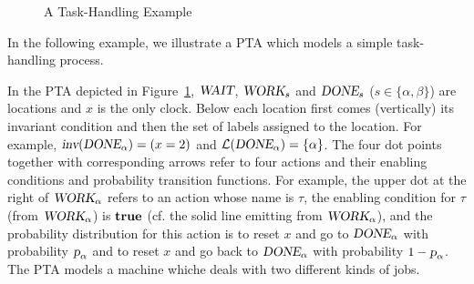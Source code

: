 
\begin{figure}
    \centering
    \resizebox{.5\textwidth}{!}{
        
        }
    \caption{A Task-Handling Example}
    \label{fig:pta}
\end{figure}

In the following example, we illustrate a PTA which models a simple task-handling process.

\begin{example}\label{ex:pta}
{\color{red}In} the PTA depicted in Figure~\ref{fig:pta}, $\mbox{\sl WAIT}$, $\mbox{\sl WORK}_{s}$ and $\mbox{\sl DONE}_{s}$ ($ s\in \{ \alpha, \beta \}$) are locations
and $x$ is the only clock. Below each location first comes (vertically) its invariant condition and then the set of labels assigned to the location. For example, $\mbox{\sl inv}(\mbox{\sl DONE}_{\alpha})=( x = 2 )$
and $\mathcal{L}(\mbox{\sl DONE}_{\alpha})=\{ \alpha \}$.
The four dot points together with corresponding arrows refer to four actions and their enabling conditions and probability transition functions.
For example, the upper dot at the right of $\mbox{\sl WORK}_{\alpha}$ refers to an action whose name
is $\tau$, the enabling condition for $\tau$ (from $\mbox{\sl WORK}_{\alpha}$) is $\mathbf{true}$ (cf. the solid line emitting from $\mbox{\sl WORK}_{\alpha}$), and the probability distribution for this action is to reset
$x$ and go to $\mbox{\sl DONE}_{\alpha}$ with probability $\mbox{\sl p}_{\alpha}$ and to reset $x$ and go back to
$\mbox{\sl DONE}_{\alpha}$ with probability $1-\mbox{\sl p}_{\alpha}$.
The PTA models a machine whiche deals with two different kinds of jobs.
\end{example}
%
%

